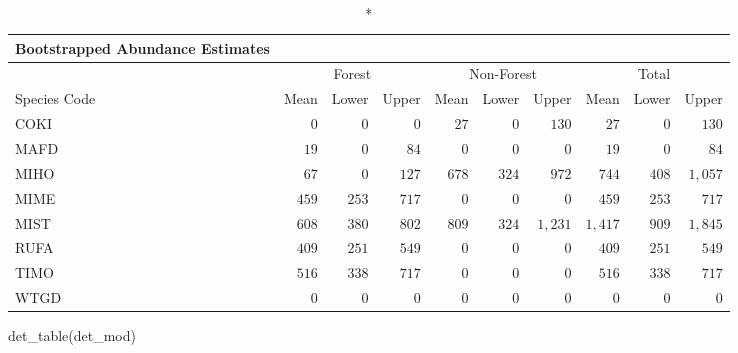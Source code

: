 \documentclass[
]{article}
\newenvironment{Shaded}{\begin{snugshade}}{\end{snugshade}}
\newcommand{\CommentTok}[1]{\textcolor[rgb]{0.56,0.35,0.01}{\textit{#1}}}
\newcommand{\ControlFlowTok}[1]{\textcolor[rgb]{0.13,0.29,0.53}{\textbf{#1}}}
\newcommand{\FunctionTok}[1]{\textcolor[rgb]{0.00,0.00,0.00}{#1}}
\newcommand{\NormalTok}[1]{#1}
\newcommand{\OtherTok}[1]{\textcolor[rgb]{0.56,0.35,0.01}{#1}}
\newcommand{\SpecialCharTok}[1]{\textcolor[rgb]{0.00,0.00,0.00}{#1}}
\begin{document}
\begin{Shaded}
\end{Shaded}

\begin{longtable}{lrrrrrrrrr}
\caption*{
{\large Bootstrapped Abundance Estimates}
} \\ 
\toprule
 & \multicolumn{3}{c}{Forest} & \multicolumn{3}{c}{Non-Forest} & \multicolumn{3}{c}{Total} \\ 
\cmidrule(lr){2-4} \cmidrule(lr){5-7} \cmidrule(lr){8-10}
Species Code & Mean & Lower & Upper & Mean & Lower & Upper & Mean & Lower & Upper \\ 
\midrule
COKI & $0$ & $0$ & $0$ & $27$ & $0$ & $130$ & $27$ & $0$ & $130$ \\ 
MAFD & $19$ & $0$ & $84$ & $0$ & $0$ & $0$ & $19$ & $0$ & $84$ \\ 
MIHO & $67$ & $0$ & $127$ & $678$ & $324$ & $972$ & $744$ & $408$ & $1,057$ \\ 
MIME & $459$ & $253$ & $717$ & $0$ & $0$ & $0$ & $459$ & $253$ & $717$ \\ 
MIST & $608$ & $380$ & $802$ & $809$ & $324$ & $1,231$ & $1,417$ & $909$ & $1,845$ \\ 
RUFA & $409$ & $251$ & $549$ & $0$ & $0$ & $0$ & $409$ & $251$ & $549$ \\ 
TIMO & $516$ & $338$ & $717$ & $0$ & $0$ & $0$ & $516$ & $338$ & $717$ \\ 
WTGD & $0$ & $0$ & $0$ & $0$ & $0$ & $0$ & $0$ & $0$ & $0$ \\ 
\bottomrule
\end{longtable}

\begin{Shaded}
\begin{Highlighting}[]
\FunctionTok{det\_table}\NormalTok{(det\_mod)}
\end{Highlighting}
\end{Shaded}
\end{document}
